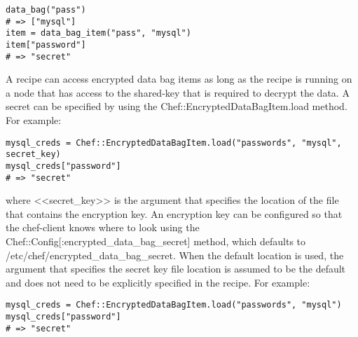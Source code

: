 \begin{lstlisting}[label=lst:my-cloud-chef-databag13]
data_bag("pass")
# => ["mysql"]
item = data_bag_item("pass", "mysql")
item["password"]
# => "secret"
\end{lstlisting}

A recipe can access encrypted data bag items as long as the recipe is running on a node that has access to the shared-key that is required to decrypt the data. A secret can be specified by using the Chef::EncryptedDataBagItem.load method. For example:

\begin{lstlisting}[label=lst:my-cloud-chef-databag14]
mysql_creds = Chef::EncryptedDataBagItem.load("passwords", "mysql", secret_key)
mysql_creds["password"]
# => "secret"
\end{lstlisting}

where <<secret\_key>> is the argument that specifies the location of the file that contains the encryption key. An encryption key can be configured so that the chef-client knows where to look using the Chef::Config[:encrypted\_data\_bag\_secret] method, which defaults to /etc/chef/encrypted\_data\_bag\_secret. When the default location is used, the argument that specifies the secret key file location is assumed to be the default and does not need to be explicitly specified in the recipe. For example:

\begin{lstlisting}[label=lst:my-cloud-chef-databag15]
mysql_creds = Chef::EncryptedDataBagItem.load("passwords", "mysql")
mysql_creds["password"]
# => "secret"
\end{lstlisting}
